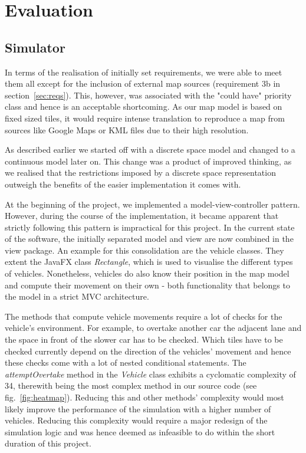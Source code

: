 \section{Evaluation}
\subsection{Simulator}\label{ss:eval_sim}
In terms of the realisation of initially set requirements, we were able to meet them all except for the inclusion of external map sources (requirement 3b in section~\ref{sec:reqs}). This, however, was associated with the "could have" priority class and hence is an acceptable shortcoming. As our map model is based on fixed sized tiles, it would require intense translation to reproduce a map from sources like Google Maps or KML files due to their high resolution. 

As described earlier we started off with a discrete space model and changed to a continuous model later on. This change was a product of improved thinking, as we realised that the restrictions imposed by a discrete space representation outweigh the benefits of the easier implementation it comes with.

At the beginning of the project, we implemented a model-view-controller pattern. However, during the course of the implementation, it became apparent that strictly following this pattern is impractical for this project. In the current state of the software, the initially separated model and view are now combined in the view package. An example for this consolidation are the vehicle classes. They extent the JavaFX class \textit{Rectangle}, which is used to visualise the different types of vehicles. Nonetheless, vehicles do also know their position in the map model and compute their movement on their own - both functionality that belongs to the model in a strict MVC architecture.

The methods that compute vehicle movements require a lot of checks for the vehicle's environment. For example, to overtake another car the adjacent lane and the space in front of the slower car has to be checked. Which tiles have to be checked currently depend on the direction of the vehicles' movement and hence these checks come with a lot of nested conditional statements. The \textit{attemptOvertake} method in the \textit{Vehicle} class exhibits a cyclomatic complexity of 34, therewith being the most complex method in our source code (see fig.~\ref{fig:heatmap}). Reducing this and other methods' complexity would most likely improve the performance of the simulation with a higher number of vehicles. Reducing this complexity would require a major redesign of the simulation logic and was hence deemed as infeasible to do within the short duration of this project.


